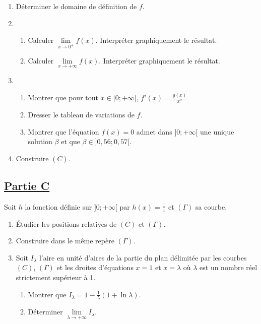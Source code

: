 \documentclass[12pt,a4paper]{article}
\begin{document}
    \begin{enumerate}
        \item Déterminer le domaine de définition de \( f \).
        \item
              \begin{enumerate}
                  \item Calculer \( \lim\limits_{x \to 0^+} f(x) \). Interpréter graphiquement le résultat.
                  \item Calculer \( \lim\limits_{x \to +\infty} f(x) \). Interpréter graphiquement le résultat.
              \end{enumerate}
        \item
              \begin{enumerate}
                  \item Montrer que pour tout \( x \in ]0; +\infty[ \), \( f'(x) = \frac{g(x)}{x^2} \)
                  \item Dresser le tableau de variations de \( f \).
                  \item Montrer que l’équation \( f(x) = 0 \) admet dans \( ]0; +\infty[ \) une unique solution \( \beta \) et que  \( \beta \in ]0,56; 0,57[. \)
              \end{enumerate}
        \item Construire \( (C) \).
    \end{enumerate}
    \subsection*{\underline{\textbf{Partie C}}}
    Soit \( h \) la fonction définie sur \( ]0; +\infty[ \) par \( h(x) = \frac{1}{x} \) et \( (\Gamma) \) sa courbe.

    \begin{enumerate}
        \item Étudier les positions relatives de \( (C) \) et \( (\Gamma) \).
        \item Construire dans le même repère \( (\Gamma) \).
        \item Soit \( I_{\lambda} \) l’aire en unité d’aires de la partie du plan délimitée par les courbes \( (C) \), \( (\Gamma) \) et les droites d’équations \( x = 1 \) et \( x = \lambda \) où \( \lambda \) est un nombre réel strictement supérieur à 1.
              \begin{enumerate}
                  \item Montrer que \( I_{\lambda} = 1 - \frac{1}{\lambda} (1 + \ln \lambda). \)
                  \item Déterminer \( \lim\limits_{\lambda \to +\infty} I_{\lambda}. \)
              \end{enumerate}
    \end{enumerate}
\end{document}
